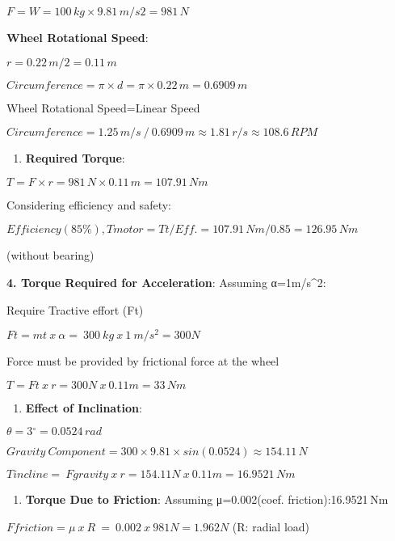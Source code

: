\documentclass[../../main]{subfiles}
\begin{document}
\(F = W = 100\, kg \times 9.81\, m/s2 = 981\, N\)

\textbf{Wheel Rotational Speed}:

\(r = 0.22\, m/2 = 0.11\, m\)

\(Circumference = \pi \times d = \pi \times 0.22\, m = 0.6909\, m\)

Wheel Rotational Speed=Linear Speed

\(Circumference = 1.25\, m/s\ /\ 0.6909\, m \approx 1.81\, r/s \approx 108.6\, RPM\)

\begin{enumerate}
\def\labelenumi{\arabic{enumi}.}
\setcounter{enumi}{2}
\item
  \textbf{Required Torque}:
\end{enumerate}

\(T = F \times r = 981\, N \times 0.11\, m = 107.91\, Nm\)

Considering efficiency and safety:

\(Efficiency(85\%),Tmotor = Tt/Eff. = 107.91\, Nm/0.85 = 126.95\, Nm\)

(without bearing)

\textbf{4. Torque Required for Acceleration}: Assuming α=1m/s\^{}2:

Require Tractive effort (Ft)

\(Ft = mt\ x\ \alpha = \ 300\ kg\ x\ 1\ m/s^{2} = 300N\)

Force must be provided by frictional force at the wheel

\(T = Ft\ x\ r = 300N\ x\ 0.11m = 33\, Nm\)

\begin{enumerate}
\def\labelenumi{\arabic{enumi}.}
\setcounter{enumi}{5}
\item
  \textbf{Effect of Inclination}:
\end{enumerate}

\(\theta = 3{^\circ} = 0.0524\, rad\)

\(Gravity\ Component = 300 \times 9.81 \times sin(0.0524) \approx 154.11\, N\)

\(Tincline = \ Fgravity\ x\ r = 154.11N\ x\ 0.11m = 16.9521\, Nm\,\)

\begin{enumerate}
\def\labelenumi{\arabic{enumi}.}
\setcounter{enumi}{6}
\item
  \textbf{Torque Due to Friction}: Assuming μ=0.002(coef.
  friction):16.9521 Nm
\end{enumerate}

\(Ffriction = \mu\ x\ R\  = \ 0.002\ x\ 981N = 1.962N\) (R: radial load)
\end{document}
